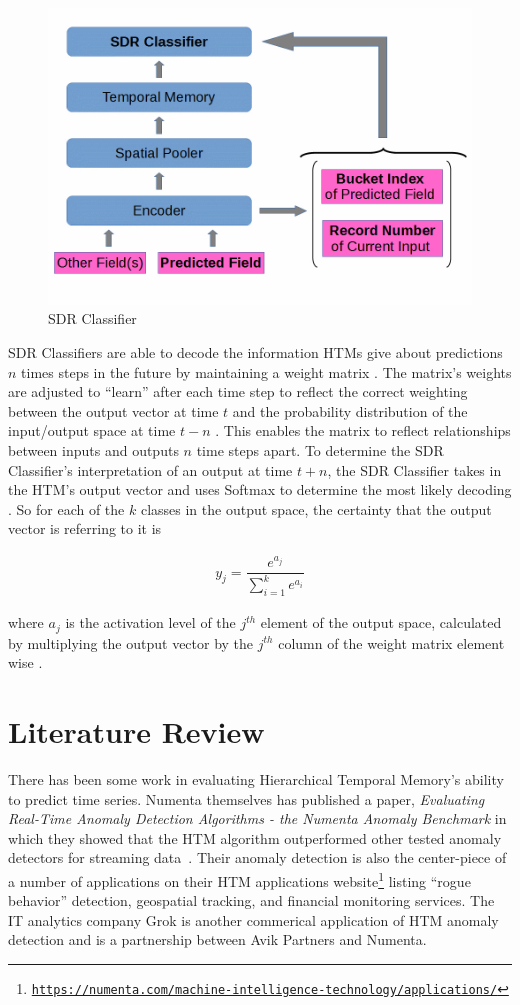 \documentclass[oneside,12pt,openany]{book}
\begin{document}
	\begin{figure}[!ht]
		\centering
		\includegraphics[width=.6\linewidth]{images/SDRClassifier.jpg}
		\caption{SDR Classifier}
		\label{fig 3}
	\end{figure}
	
	SDR Classifiers are able to decode the information HTMs give about predictions $n$ times steps in the future by maintaining a weight matrix \cite{Dillon}. The matrix's weights are adjusted to ``learn'' after each time step to reflect the correct weighting between the output vector at time $t$ and the probability distribution of the input/output space at time $t-n$ \cite{Dillon}. This enables the matrix to reflect relationships between inputs and outputs $n$ time steps apart. To determine the SDR Classifier's interpretation of an output at time $t+n$, the SDR Classifier takes in the HTM's output vector and uses Softmax to determine the most likely decoding \cite{Dillon}. So for each of the $k$ classes in the output space, the certainty that the output vector is referring to it is 
	
	\begin{align}
	\label{eqn:htmclassact}
	y_{j} = \dfrac{e^{a_{j}}}{\sum_{i=1}^{k} e^{a_{i}}}
	\end{align}
	
	
	 \noindent where $a_{j}$ is the activation level of the $j^{th}$ element of the output space, calculated by multiplying the output vector by the $j^{th}$ column of the weight matrix element wise \cite{Dillon}. 
	
	\chapter{Literature Review}
	
	
	There has been some work in evaluating Hierarchical Temporal Memory's ability to predict time series. Numenta themselves has published a paper, \textit{Evaluating Real-Time Anomaly Detection Algorithms - the Numenta Anomaly Benchmark} in which they showed that the HTM algorithm outperformed other tested anomaly detectors for streaming data~\cite{NAB}. Their anomaly detection is also the center-piece of a number of applications on their HTM applications website\footnote{\href{https://numenta.com/machine-intelligence-technology/applications/}{\texttt{https://numenta.com/machine-intelligence-technology/applications/}}} listing ``rogue behavior'' detection, geospatial tracking, and financial monitoring services. The IT analytics company Grok is another commerical application of HTM anomaly detection and is a partnership between Avik Partners and Numenta.
	
\end{document}
